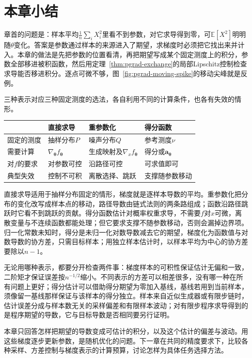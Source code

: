 \section{本章小结}
\label{sec:pgrad-summary}

章首的问题是：样本平均$\frac{1}{n}\sum_{i}X_{i}^{2}$里看不到参数，对它求导得到零，可$\mathbb{E}[X^{2}]$明明随$\theta$变化。答案是参数通过样本的来源进入了期望，求梯度时必须把它找出来并计入。本章的做法是先把参数的位置看清，再把期望写成某个固定测度上的积分，参数全部移进被积函数，然后用定理~\ref{thm:pgrad-exchange}的局部Lipschitz控制检查求导能否移进积分。逐点可微不够，图~\ref{fig:pgrad-moving-spike}的移动尖峰就是反例。

三种表示对应三种固定测度的选法，各自利用不同的计算条件，也各有失效的情形。

\begin{BookInlineTable}
  \centering
  \caption{三种梯度表示的比较。}
  \label{tab:pgrad-methods}
  \begin{tabular}{@{}llll@{}}
    \toprule
    & 直接求导 & 重参数化 & 得分函数 \\
    \midrule
    固定的测度 & 抽样分布$P$ & 噪声分布$Q$ & 参考测度$\nu$ \\
    需要计算 & $\nabla_{\bm{\theta}}f_{\bm{\theta}}$ & 生成映射及$\nabla_{x}f_{\bm{\theta}}$ & 得分或$\bm{a}_{\bm{\theta}}$ \\
    对$f$的要求 & 对参数可控 & 沿路径可控 & 可求值即可 \\
    典型失效 & 控制不可积 & 离散选择、跳跃 & 支撑随参数移动 \\
    \bottomrule
  \end{tabular}
\end{BookInlineTable}

直接求导适用于抽样分布固定的情形，梯度就是逐样本导数的平均。重参数化把分布的变化改写成样本点的移动，路径导数由链式法则的两条路组成；函数沿路径跳跃时它看不到跳跃的贡献。得分函数估计对概率权重求导，不需要$f$对$x$可微，离散变量与不连续函数都能处理；但它要求支撑不随参数移动，否则会漏掉边界项。归一化常数未知时，得分是未归一化对数导数减去它的期望，梯度化为函数值与对数导数的协方差，只需目标样本；用独立样本估计时，以样本平均为中心的协方差要除以$n-1$。

无论用哪种表示，都要分开检查两件事：梯度样本的可积性保证估计无偏和一致，二阶矩才保证误差按$n^{-1/2}$缩小。不同表示的方差可以相差很多，没有哪一种在所有问题上更好；得分估计可以借助得分期望为零加入基线，基线若用到当前样本，须像留一基线那样保证与该样本的得分独立。样本来自近似生成器或有限步链时，估计误差分成与样本数无关的采样偏差和有限样本波动；对有限步程序求导得到的是程序期望的导数，它与目标导数是否相同要另行证明。

本章只回答怎样把期望的导数变成可估计的积分，以及这个估计的偏差与波动。用这些梯度逐步更新参数，是随机优化的问题。下一章在共同的精度要求下，比较各种采样、方差控制与梯度表示的计算预算，讨论怎样为具体任务选择方法。
